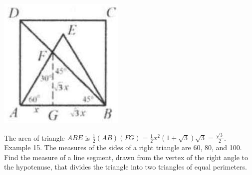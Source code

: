 \documentclass[10pt]{article}
\begin{document}
\begin{center}
\includegraphics[max width=\textwidth]{2025_04_17_97bc1f7e44d93c271a88g-083(1)}
\end{center}

The area of triangle \(A B E\) is \(\frac{1}{2}(A B)(F G)=\frac{1}{2} x^{2}(1+\sqrt{3}) \sqrt{3}=\frac{\sqrt{3}}{2}\).\\
Example 15. The measures of the sides of a right triangle are 60, 80, and 100. Find the measure of a line segment, drawn from the vertex of the right angle to the hypotenuse, that divides the triangle into two triangles of equal perimeters.
\end{document}
